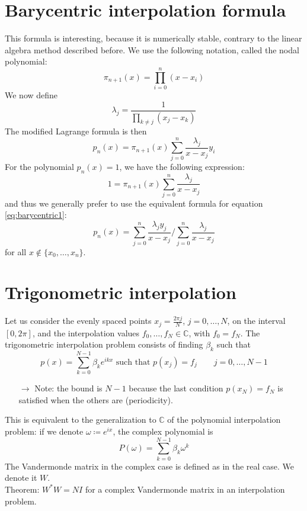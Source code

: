 \documentclass[12pt, openany]{report}
\theoremstyle{definition}
\begin{document}
\section{Barycentric interpolation formula}
This formula is interesting, because it is numerically stable, contrary to the linear algebra method described before. We use the following notation, called the nodal polynomial:
\begin{equation}
    \pi_{n+1}(x) = \prod_{i=0}^n (x-x_i)
\end{equation}
We now define 
\begin{equation}
    \lambda_j = \frac{1}{\prod_{k\neq j}(x_j-x_k)}
\end{equation}
The modified Lagrange formula is then 
\begin{equation}\label{eq:barycentric1}
    p_n(x) = \pi_{n+1}(x) \sum_{j=0}^n \frac{\lambda_j}{x-x_j}y_i
\end{equation}
For the polynomial \(p_n(x) = 1\), we have the following expression:\[1 = \pi_{n+1}(x) \sum_{j=0}^n \frac{\lambda_j}{x-x_j}\] and thus we generally prefer to use the equivalent formula for equation \eqref{eq:barycentric1}:
\begin{equation}\label{eq:barycentric2}
    p_n(x) = \sum_{j=0}^n \frac{\lambda_jy_j}{x-x_j} / \sum_{j=0}^n \frac{\lambda_j}{x-x_j}
\end{equation}
for all \(x\notin \{x_0,\dots,x_n\}\).
\section{Trigonometric interpolation}
Let us consider the evenly spaced points \(x_j = \frac{2\pi j}{N}\), \(j=0,\dots,N\), on the interval \([0,2\pi]\), and the interpolation values \(f_0,\dots, f_N\in \mathbb{C}\), with \(f_0=f_N\). The trigonometric interpolation problem consists of finding \(\beta_k\) such that 
\begin{equation}
    p(x) = \sum_{k=0}^{N-1}\beta_ke^{ikx}\text{ such that } p(x_j) = f_j\qquad j=0,\dots,N-1
\end{equation}
\begin{itemize}
    \item [\(\rightarrow\)] Note: the bound is \(N-1\) because the last condition \(p(x_N) = f_N\) is satisfied when the others are (periodicity). 
\end{itemize}
This is equivalent to the generalization to \(\mathbb{C}\) of the polynomial interpolation problem: if we denote \(\omega \coloneqq e^{ix}\), the complex polynomial is 
\begin{equation}
    P(\omega) = \sum_{k=0}^{N-1} \beta_k \omega^k
\end{equation}
The Vandermonde matrix in the complex case is defined as in the real case. We denote it \(W\). \\
Theorem: \(W^*W=NI\) for a complex Vandermonde matrix in an interpolation problem. \\
\end{document}
